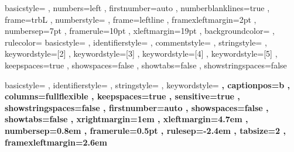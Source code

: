 %
%
%
%
%
%
%
%
{ basicstyle=\ttfamily\small%
, numbers=left%
, firstnumber=auto  %
, numberblanklines=true%
, frame=trbL%
, numberstyle=\tiny%
, frame=leftline%
, framexleftmargin=2pt%
, numbersep=7pt%
, framerule=10pt%
, xleftmargin=19pt%
, backgroundcolor=\color{listingstyle_boxed_background}%
, rulecolor=\color{listingstyle_boxed_rule}%
}%
%
%
{ basicstyle=\ttfamily%
, identifierstyle=%
, commentstyle=\color{listingstyle_coloredHaskell2010_darkgrey}%
, stringstyle=\color{listingstyle_coloredHaskell2010_darkgreen}%
, keywordstyle=[2]\color{listingstyle_coloredHaskell2010_darkred}%
, keywordstyle=[3]\color{listingstyle_coloredHaskell2010_darkred}%
, keywordstyle=[4]\color{listingstyle_coloredHaskell2010_darkgreen}%
, keywordstyle=[5]\color{listingstyle_coloredHaskell2010_darkblue}%
, keepspaces=true%
, showspaces=false%
, showtabs=false%
, showstringspaces=false%
}%












{ basicstyle=\small\ttfamily
	, identifierstyle=
	, stringstyle=
	, keywordstyle=\bfseries
	, captionpos=b %
	, columns=fullflexible
	, keepspaces=true
	, sensitive=true
	, showstringspaces=false
	, firstnumber=auto
	, showspaces=false
	, showtabs=false
	, xrightmargin=1em
	, xleftmargin=4.7em
	, numbersep=0.8em
	, framerule=0.5pt
	, rulesep=-2.4em
	, tabsize=2
	, framexleftmargin=2.6em
}
\lstset{style=default}
